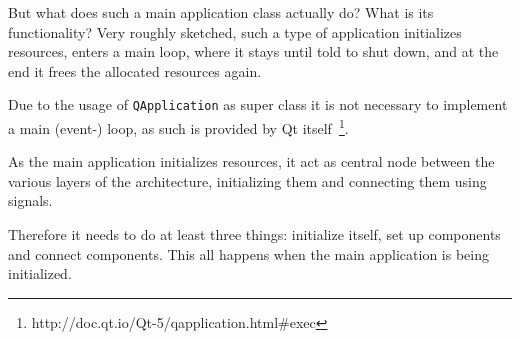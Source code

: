 \documentclass[
    a4paper,      %
    10pt,         %
    openright,    %
    notitlepage,  %
    parskip=half, %
]{scrreprt}       %
\theoremstyle{definition}                    %
\begin{document}
But what does such a main application class actually do? What is its
functionality? Very roughly sketched, such a type of application initializes
resources, enters a main loop, where it stays until told to shut down, and at
the end it frees the allocated resources again.

Due to the usage of \verb+QApplication+ as super class it is not necessary to
implement a main (event-) loop, as such is provided by Qt
itself~\footnote{http://doc.qt.io/Qt-5/qapplication.html\#exec}.

As the main application initializes resources, it act as central node between the
various layers of the architecture, initializing them and connecting them using
signals.\cite[pp. 37 --- 38]{osterwalder_qde_2016}

Therefore it needs to do at least three things: initialize itself, set up
components and connect components. This all happens when the main application is
being initialized.
\end{document}
